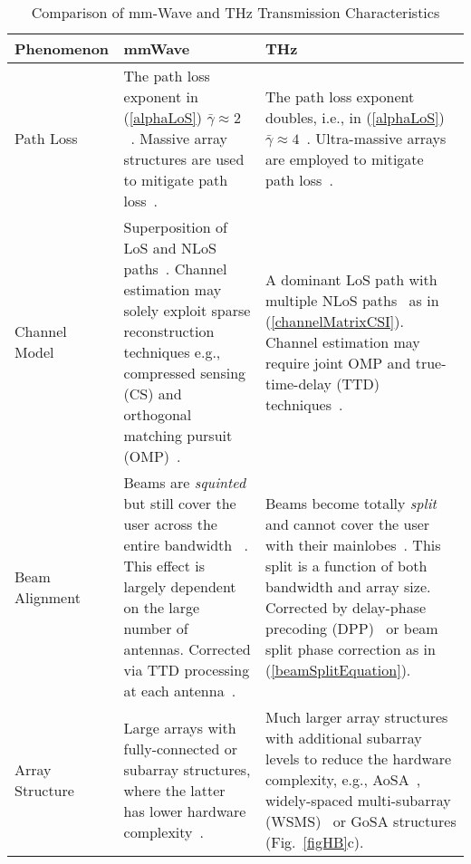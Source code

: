 \documentclass[journal,10pt]{IEEEtran}
\begin{document}
	
	\begin{table*}[t]
		{\color{black}
			\caption{Comparison of mm-Wave and THz Transmission Characteristics}
			\label{tableComparison}
			\centering
			\begin{tabular}{p{}p{}p{}}
				\hline
				\hline
				\bf{Phenomenon}& \bf mmWave	& \bf THz \\
				\hline 
				Path Loss &The path loss exponent in (\ref{alphaLoS}) $\bar{\gamma}\approx 2$~\cite{teraMIMO}. Massive array structures are used to mitigate path loss~\cite{heath2016overview,mishra2019toward}. &The path loss exponent doubles, i.e., in (\ref{alphaLoS}) $\bar{\gamma}\approx 4$~\cite{teraMIMO}. Ultra-massive arrays are employed to mitigate path loss~\cite{teraMIMO,ummimoComMagYeLi,ummimoTareq}.  \\
				\hline
				Channel Model&Superposition of LoS and NLoS paths~\cite{heath2016overview,mimoHybridLeus1}. Channel estimation may solely exploit sparse reconstruction techniques e.g., compressed sensing (CS) and orthogonal matching pursuit (OMP)~\cite{heath2016overview}.& A dominant LoS path with
				multiple NLoS paths~\cite{teraMIMO,ummimoTareq,ummimoHBThzSVModel} as in (\ref{channelMatrixCSI}). Channel estimation may require joint OMP and true-time-delay (TTD) techniques~\cite{channelEstThz2,trueTimeDelayBeamSquint}. \\
				\hline
				Beam Alignment & Beams are \textit{squinted} but still cover the user across the entire bandwidth ~\cite{beamSquintGaoMagazine,beamSquintWang2019Nov}. This effect is largely dependent on the large number of antennas. Corrected via TTD processing at each antenna~\cite{trueTimeDelayBeamSquint,trueTimeDelayMagazine}.&Beams become totally \textit{split} and cannot cover the user with their mainlobes~\cite{thz_beamSplitConf,thz_beamSplit}. This split is a function of both bandwidth and array size. Corrected by delay-phase precoding (DPP)~\cite{thz_beamSplitConf,beamSplitDai2021Feb} or beam split phase correction as in (\ref{beamSplitEquation}). \\
				\hline
				Array Structure & Large arrays with fully-connected or subarray structures, where the latter has lower hardware complexity~\cite{hybridBFAltMin,heath2016overview}. & Much larger array structures with additional subarray levels to reduce the hardware complexity, e.g., AoSA~\cite{ummimoComMagYeLi}, widely-spaced multi-subarray (WSMS)~\cite{ummimoHBChallencesOpenProblems} or GoSA structures (Fig.~\ref{figHB}c).\\ 
				\hline
				\hline
			\end{tabular}
		}
	\end{table*}
	
\end{document}
